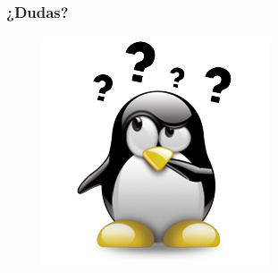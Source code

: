 \documentclass{beamer}
\begin{document}
\begin{frame}
\frametitle{¿Dudas?} 
\begin{figure}
\includegraphics[scale=0.9]{imagenes/dudas.png} 
\end{figure} 
\end{frame}
\end{document}
